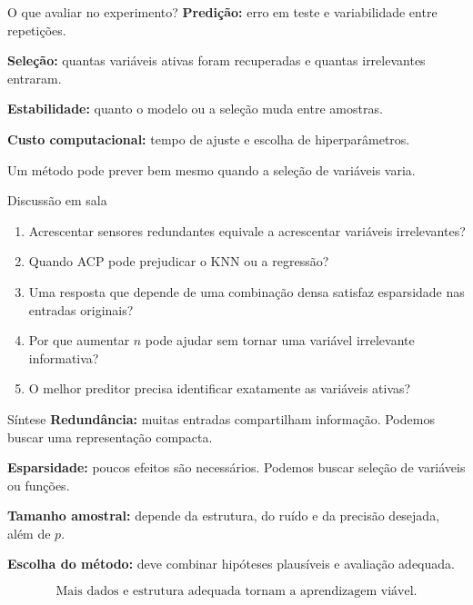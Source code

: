\documentclass[
  10pt,
  ignorenonframetext,
  aspectratio=169,
  brazilian,
]{beamer}
\providecommand{\tightlist}{%
  \setlength{\itemsep}{0pt}\setlength{\parskip}{0pt}}
\begin{document}
\begin{frame}{O que avaliar no experimento?}
\protect{}\label{o-que-avaliar-no-experimento}
\textbf{Predição:} erro em teste e variabilidade entre repetições.

\textbf{Seleção:} quantas variáveis ativas foram recuperadas e quantas
irrelevantes entraram.

\textbf{Estabilidade:} quanto o modelo ou a seleção muda entre amostras.

\textbf{Custo computacional:} tempo de ajuste e escolha de
hiperparâmetros.

Um método pode prever bem mesmo quando a seleção de variáveis varia.
\end{frame}

\begin{frame}{Discussão em sala}
\protect{}\label{discussuxe3o-em-sala}
\begin{enumerate}
\tightlist
\item
  Acrescentar sensores redundantes equivale a acrescentar variáveis
  irrelevantes?
\item
  Quando ACP pode prejudicar o KNN ou a regressão?
\item
  Uma resposta que depende de uma combinação densa satisfaz esparsidade
  nas entradas originais?
\item
  Por que aumentar \(n\) pode ajudar sem tornar uma variável irrelevante
  informativa?
\item
  O melhor preditor precisa identificar exatamente as variáveis ativas?
\end{enumerate}

\end{frame}

\begin{frame}{Síntese}
\protect{}\label{suxedntese}
\textbf{Redundância:} muitas entradas compartilham informação. Podemos
buscar uma representação compacta.

\textbf{Esparsidade:} poucos efeitos são necessários. Podemos buscar
seleção de variáveis ou funções.

\textbf{Tamanho amostral:} depende da estrutura, do ruído e da precisão
desejada, além de \(p\).

\textbf{Escolha do método:} deve combinar hipóteses plausíveis e
avaliação adequada.

\[
\boxed{\text{Mais dados e estrutura adequada tornam a aprendizagem viável.}}
\]
\end{frame}
\end{document}
